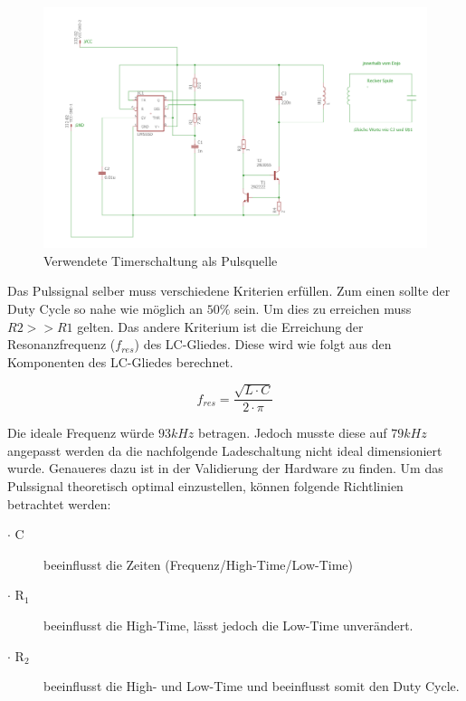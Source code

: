 \begin{figure}[H]
	\begin{center}
		\includegraphics[width=160mm]{data/Tranceiver.png}
		\caption[Verwendete Timerschaltung als Pulsquelle]{Verwendete Timerschaltung als Pulsquelle} %
		\label{fig:Tranceiver-Schaltung}
	\end{center}
\end{figure}
 
Das Pulssignal selber muss verschiedene Kriterien erfüllen. Zum einen sollte der Duty Cycle so nahe wie möglich an $50\%$ sein. Um dies zu erreichen muss $R2 >> R1$ gelten. Das andere Kriterium ist die Erreichung der Resonanzfrequenz ($f_{res}$) des LC-Gliedes. Diese wird wie folgt aus den Komponenten des LC-Gliedes berechnet.

\begin{equation}\label{eq:Resonanz}
f_{res}=\frac{\sqrt{L\cdot C}}{2\cdot \pi}
\end{equation}

Die ideale Frequenz würde $93kHz$ betragen. Jedoch musste diese auf $79kHz$ angepasst werden da die nachfolgende Ladeschaltung nicht ideal dimensioniert wurde. Genaueres dazu ist in der Validierung der Hardware zu finden.
Um das Pulssignal theoretisch optimal einzustellen, können folgende Richtlinien betrachtet werden:

\begin{description}
	\item [$\cdot$ C] beeinflusst die Zeiten (Frequenz/High-Time/Low-Time)
	\item [$\cdot$ R$_{1}$] beeinflusst die High-Time, lässt jedoch die Low-Time unverändert.
	\item [$\cdot$ R$_{2}$ ] beeinflusst die High- und Low-Time und beeinflusst somit den Duty Cycle.
\end{description}


